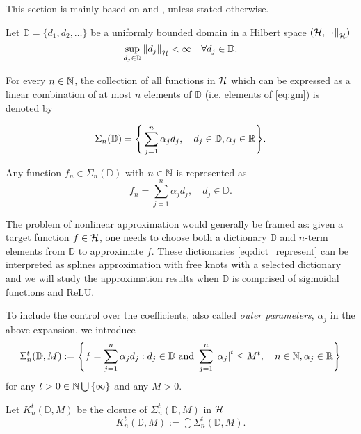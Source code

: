 This section is mainly based on \cite[Chapter 8]{devore_1998} and
\cite{vandervaartWeakConvergenceEmpirical1996}, unless stated otherwise.

Let $\mathbb{D} = \{d_1,d_2,\dots\}$ be a uniformly bounded domain in a Hilbert
space $(\mathcal{H}, \left\| \cdot \right\|_{\mathcal{H}})$
\begin{equation}
    \sup_{d_j\in \mathbb{D}} \left\| d_j \right\|_{\mathcal{H}} < \infty \quad 
    \forall d_j \in \mathbb{D}.
\end{equation}

For every $n \in \mathbb{N}$, the collection of all functions in $\mathcal{H}$
which can be expressed as a linear combination of at most $n$ elements of
$\mathbb{D}$ (i.e. elements of \eqref{eq:gm}) is denoted by

\begin{equation}
    \label{eq:dict_represent}
    \Sigma_n(\mathbb{D}) = \Bigg\{
        \sum_{j=1}^n \alpha_j d_j, \quad
        d_j \in \mathbb{D}, \alpha_j \in \mathbb{R}
    \Bigg\}.
\end{equation}

Any function $f_n \in \Sigma_n(\mathbb{D})$ with $n \in \mathbb{N}$ is represented as
\begin{equation}
    \label{eq:gm}
    f_n = \sum_{j=1}^n \alpha_j d_j, \quad d_j \in \mathbb{D}.
\end{equation}

The problem of nonlinear approximation would generally be framed as: given a
target function $f \in \mathcal{H}$, one needs to choose both a dictionary
$\mathbb{D}$ and $n$-term elements from $\mathbb{D}$ to approximate $f$. These
dictionaries \eqref{eq:dict_represent} can be interpreted as splines
approximation with free knots with a selected dictionary and we will study the
approximation results when $\mathbb{D}$ is comprised of sigmoidal functions and
ReLU.

To include the control over the coefficients, also called \textit{outer
parameters}, $\alpha_j$ in the above expansion, we introduce
\begin{equation}
    \label{eq:dict_sigma}
    \Sigma^{t}_n(\mathbb{D}, M) := \Bigg\{
        f = \sum_{j=1}^n \alpha_j d_j: 
        d_j \in \mathbb{D} \textnormal{ and } 
        \sum_{j=1}^n \left| \alpha_j \right|^t \leq M^t, \quad 
        n \in \mathbb{N}, \alpha_j \in \mathbb{R}
    \Bigg\}
\end{equation}
for any $t > 0 \in \mathbb{N} \bigcup\, \{\infty\}$ and any $M > 0$. 

Let $K^t_n(\mathbb{D}, M)$ be the closure of $\Sigma^t_n(\mathbb{D}, M)$ in
$\mathcal{H}$
\begin{equation}
    K^t_n(\mathbb{D}, M) := \closure{\Sigma^t_n(\mathbb{D}, M)}.
\end{equation}

